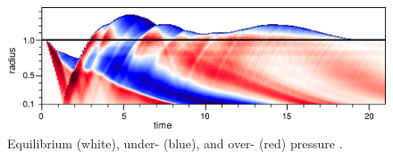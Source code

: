 \documentclass{beamer}
\begin{document}
\begin{frame}

  \begin{figure}[htb!]
    \centering
    \includegraphics[width=\textwidth]{fig.pressure.jpg}
    \caption{Equilibrium (white), under- (blue), and over- (red) pressure
             \citep{bmd2003}.}
  \end{figure}

\end{frame}
\end{document}

